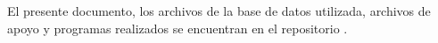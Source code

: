El presente documento, los archivos de la base de datos utilizada, archivos de apoyo y programas realizados se encuentran en el repositorio .